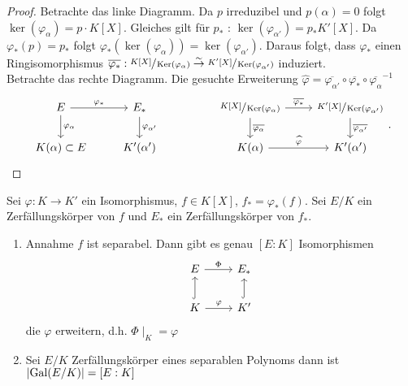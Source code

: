 \begin{proof}
	Betrachte das linke Diagramm.
	Da $p$ irreduzibel und $p(\alpha) = 0$ folgt $\ker(\varphi_{\alpha}) = p \cdot K[X]$.
	Gleiches gilt für $p_{*}$ : $\ker(\varphi_{\alpha'}) = p_{*} K'[X]$.
	Da $\varphi_{*}(p) = p_{*}$ folgt $\varphi_{*}(\ker(\varphi_{\alpha})) = \ker(\varphi_{\alpha'})$.
	Daraus folgt, dass $\varphi_{*}$ einen Ringisomorphismus $\overline{\varphi_{*}}: \sfrac{K[X]}{\operatorname{Ker}(\varphi_{\alpha})} \overset{\sim}{\to} \sfrac{K'[X]}{\operatorname{Ker}(\varphi_{\alpha'})}$ 
	induziert.\\
	Betrachte das rechte Diagramm.
	Die gesuchte Erweiterung $\widehat{\varphi} = \overline{\varphi_{\alpha'}} \circ \overline{\varphi_{*}} \circ \overline{\varphi_{\alpha}}^{-1}$
	\[
	\begin{tikzcd}
		E \arrow[r, "\varphi_*"] \arrow[d, "\varphi_\alpha"] & E_* \arrow[d, "\varphi_{\alpha'}"] &  & \sfrac{K[X]}{\ker(\varphi_{\alpha})}
\arrow[d, "\overline{\varphi_{\alpha}}"] \arrow[r,"\overline{\varphi_{*}}"] & \sfrac{K'[X]}{\ker(\varphi_{\alpha'})} \arrow[d, "\overline{\varphi_{\alpha'}}"] \\
K(\alpha) \subset E                                  & K'(\alpha')                        &  & K(\alpha) \arrow[r, "\widehat{\varphi}"]   & K'(\alpha') 
\end{tikzcd}
	.\] 
\end{proof}

\begin{theorem}
	Sei $\varphi: K \to K'$ ein Isomorphismus, $f \in K[X]$, $f_{*} = \varphi_{*}(f)$.
	Sei $E / K$ ein Zerfällungskörper von $f$ und $E_{*}$ ein Zerfällungskörper von $f_{*}$.
	\begin{enumerate}[(1)]
		\item Annahme $f$ ist separabel. Dann gibt es genau $[E:K]$ Isomorphismen 
			\[
				\begin{tikzcd}
					E \arrow[r, "\Phi"]                    & E_*                \\
					K \arrow[r, "\varphi"] \arrow[u, hook] & K' \arrow[u, hook]
				\end{tikzcd}
			\]
			die $\varphi$ erweitern, d.h. $\Phi \mid_{K} = \varphi$
		\item Sei $E / K$ Zerfällungskörper eines separablen Polynoms dann ist $\abs{\operatorname{Gal}(E / K)} = [E:K]$ 
	\end{enumerate}
\end{theorem}

